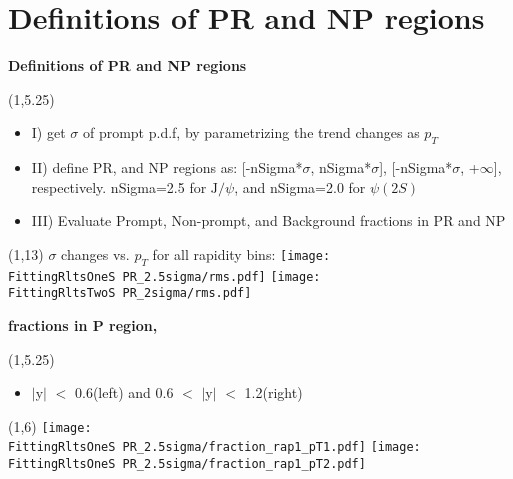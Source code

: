 \documentclass[11pt,slidescentered,red,compress,handout,hyperref={bookmarks=true},mathseriftable]{beamer}
\newcommand{\Jpsi}{\mathrm{J}/\psi}
\newcommand{\FittingRltsOneS}{../Psi1S/Fit/parameter/evaluateCtau/}
\newcommand{\FittingRltsTwoS}{../Psi2S/Fit/parameter/evaluateCtau/}
\begin{document}
%

\section{Definitions of PR and NP regions } 
\begin{frame}[t]{\small \bf Definitions of PR and NP regions }{}
\begin{textblock}{48}(1,5.25)
\begin{itemize}
\scriptsize \item I) get $\sigma$ of prompt p.d.f, by parametrizing the trend changes as $p_{T}$
\scriptsize \item II) define PR, and NP regions as: [-nSigma*$\sigma$, nSigma*$\sigma$], [-nSigma*$\sigma$, +$\infty$], respectively.
nSigma=2.5 for $\Jpsi$, and nSigma=2.0 for $\psi(2S)$
\scriptsize \item III) Evaluate Prompt, Non-prompt, and Background fractions in PR and NP
\end{itemize}
\end{textblock}
\begin{textblock}{48}(1,13)
\scriptsize $\sigma$ changes vs. $p_{T}$ for all rapidity bins: 
\hspace*{10pt} \texttt{[image: \\FittingRltsOneS PR\_2.5sigma/rms.pdf]}
\hspace*{10pt} \texttt{[image: \\FittingRltsTwoS PR\_2sigma/rms.pdf]}
\end{textblock}
\end{frame}

\begin{frame}[t]{\small \bf fractions in P region,  }{}
\begin{textblock}{48}(1,5.25)
\begin{itemize}
\scriptsize \item  $|$y$|$ $<$ 0.6(left) and 0.6 $<$ $|$y$|$ $<$ 1.2(right)
\end{itemize}
\end{textblock}
\begin{textblock}{48}(1,6)
\hspace*{10pt} \texttt{[image: \\FittingRltsOneS PR\_2.5sigma/fraction\_rap1\_pT1.pdf]}
\hspace*{10pt} \texttt{[image: \\FittingRltsOneS PR\_2.5sigma/fraction\_rap1\_pT2.pdf]}
\end{textblock}
\end{frame}
\end{document}

